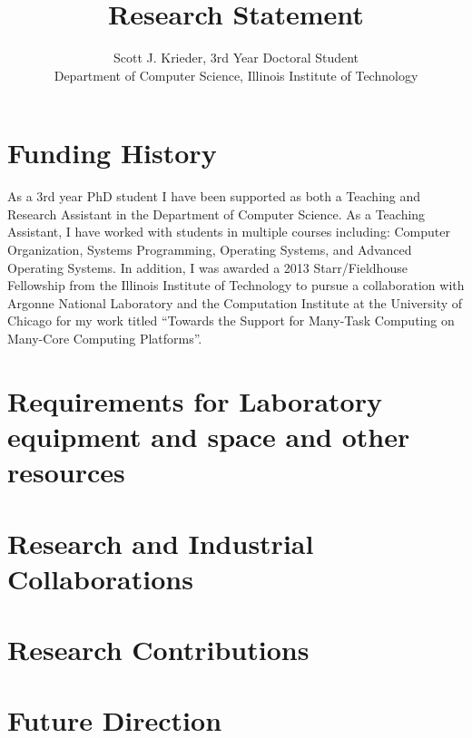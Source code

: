\documentclass[conference]{IEEEtran}
\begin{document}
%
\title{Research Statement}


\author{Scott J. Krieder, 3rd Year Doctoral Student\\
Department of Computer Science, Illinois Institute of Technology}

\maketitle


\IEEEpeerreviewmaketitle

\section{Funding History}
As a 3rd year PhD student I have been supported as both a Teaching and Research Assistant in the Department of Computer Science. As a Teaching Assistant, I have worked with students in multiple courses including: Computer Organization, Systems Programming, Operating Systems, and Advanced Operating Systems. In addition, I was awarded a 2013 Starr/Fieldhouse Fellowship \cite{Starr} from the Illinois Institute of Technology to pursue a collaboration with Argonne National Laboratory and the Computation Institute at the University of Chicago for my work titled “Towards the Support for Many-Task Computing on Many-Core Computing Platforms”.

\section{Requirements for Laboratory equipment and space and other resources}
\section{Research and Industrial Collaborations}
\section{Research Contributions}
\section{Future Direction}
\end{document}
